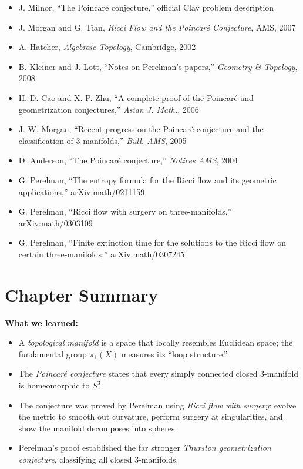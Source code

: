 \begin{itemize}
  \item J. Milnor, ``The Poincar\'{e} conjecture,'' official Clay problem description
  \item J. Morgan and G. Tian, \textit{Ricci Flow and the Poincar\'{e} Conjecture}, AMS, 2007
  \item A. Hatcher, \textit{Algebraic Topology}, Cambridge, 2002
  \item B. Kleiner and J. Lott, ``Notes on Perelman's papers,'' \textit{Geometry \& Topology}, 2008
  \item H.-D. Cao and X.-P. Zhu, ``A complete proof of the Poincar\'{e} and geometrization conjectures,'' \textit{Asian J. Math.}, 2006
  \item J. W. Morgan, ``Recent progress on the Poincar\'{e} conjecture and the classification of 3-manifolds,'' \textit{Bull. AMS}, 2005
  \item D. Anderson, ``The Poincar\'{e} conjecture,'' \textit{Notices AMS}, 2004
  \item G. Perelman, ``The entropy formula for the Ricci flow and its geometric applications,'' arXiv:math/0211159
  \item G. Perelman, ``Ricci flow with surgery on three-manifolds,'' arXiv:math/0303109
  \item G. Perelman, ``Finite extinction time for the solutions to the Ricci flow on certain three-manifolds,'' arXiv:math/0307245
\end{itemize}

\section*{Chapter Summary}

\noindent\textbf{What we learned:}
\begin{itemize}
  \item A \emph{topological manifold} is a space that locally resembles Euclidean space; the fundamental group $\pi_1(X)$ measures its ``loop structure.''
  \item The \emph{Poincar\'{e} conjecture} states that every simply connected closed 3-manifold is homeomorphic to $S^3$.
  \item The conjecture was proved by Perelman using \emph{Ricci flow with surgery}: evolve the metric to smooth out curvature, perform surgery at singularities, and show the manifold decomposes into spheres.
  \item Perelman's proof established the far stronger \emph{Thurston geometrization conjecture}, classifying all closed 3-manifolds.
\end{itemize}

